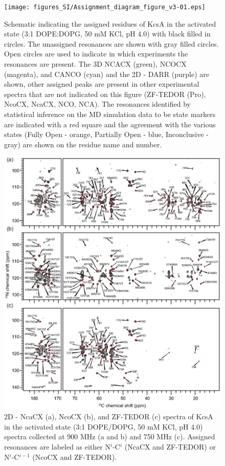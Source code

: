 \documentclass[%
 aip,
 amsmath,amssymb,
 preprint,%
]{revtex4-1}
\begin{document}
\begin{figure}[tbp]
	\texttt{[image: figures\_SI/Assignment\_diagram\_figure\_v3-01.eps]}
	 \caption{\scriptsize
	 Schematic indicating the assigned residues of KcsA in the activated state (3:1 DOPE:DOPG, 50 mM KCl, pH 4.0) with black filled in circles. The unassigned resonances are shown with gray filled circles. Open circles are used to indicate in which experiments the resonances are present. The 3D NCACX (green), NCOCX (magenta), and CANCO (cyan) and the 2D - DARR (purple) are shown, other assigned peaks are present in other experimental spectra that are not indicated on this figure (ZF-TEDOR (Pro), NcoCX, NcaCX, NCO, NCA). The resonances identified by statistical inference on the MD simulation data to be state markers are indicated with a red square and the agreement with the various states (Fully Open - orange, Partially Open - blue, Inconclusive - gray) are shown on the residue name and number. 
}
\label{SI_NMR_assign_scheme}
\end{figure}

\begin{figure}[tbp]
	\includegraphics[width=\textwidth]{figures_SI/2Ds_all_v2-01.eps}
	 \caption{\scriptsize
	 2D - NcaCX (a), NcoCX (b), and ZF-TEDOR (c) spectra of KcsA in the activated state (3:1 DOPE/DOPG, 50 mM KCl, pH 4.0) spectra collected at 900 MHz (a and b) and 750 MHz (c). Assigned resonances are labeled as either N$^i$-C$^i$ (NcaCX and ZF-TEDOR) or N$^i$-C$^{i-1}$ (NcoCX and ZF-TEDOR).
}
\label{SI_NMR_full_2Ds}
\end{figure}
\end{document}

